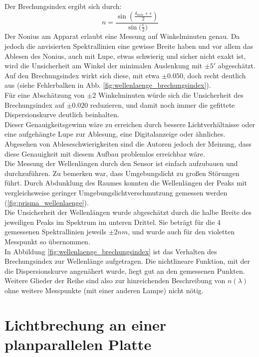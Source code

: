 \documentclass[12pt,a4paper]{article}
\begin{document}
\begin{multicols}{2}
Der Brechungsindex ergibt sich durch:
$$n = \frac{\sin{(\frac{\delta_{min} + \epsilon}{2})}}{\sin{(\frac{\epsilon}{2}})}$$
Der Nonius am Apparat erlaubt eine Messung auf Winkelminuten genau. Da jedoch die anvisierten Spektrallinien eine gewisse Breite haben und vor allem das Ablesen des Nonius, auch mit Lupe, etwas schwierig und sicher nicht exakt ist, wird die Unsicherheit am Winkel der minimalen Auslenkung mit $\pm 5'$ abgeschätzt.\\
Auf den Brechungsindex wirkt sich diese, mit etwa $\pm 0.050$, doch recht deutlich aus (siehe Fehlerbalken in Abb. \ref{fig:wellenlaenge_brechungsindex}).\\
Für eine Abschätzung von $\pm 2$ Winkelminuten würde sich die Unsicherheit des Brechungsindex auf $\pm 0.020$ reduzieren, und damit noch immer die gefittete Dispersionskurve deutlich beinhalten.\\
Dieser Genauigkeitsgewinn wäre zu erreichen durch bessere Lichtverhältnisse oder eine aufgehängte Lupe zur Ablesung, eine Digitalanzeige oder ähnliches. Abgesehen von Ableseschwierigkeiten sind die Autoren jedoch der Meinung, dass diese Genauigkeit mit diesem Aufbau problemlos erreichbar wäre.
\\
Die Messung der Wellenlängen durch den Sensor ist einfach aufzubauen und durchzuführen. Zu bemerken war, dass Umgebungslicht zu großen Störungen führt. Durch Abdunklung des Raumes konnten die Wellenlängen der Peaks mit vergleichsweise geringer Umgebungslichtverschmutzung gemessen werden (\ref{fig:prisma_wellenlaenge}).\\
Die Unsicherheit der Wellenlängen wurde abgeschätzt durch die halbe Breite des jeweiligen Peaks im Spektrum im unteren Drittel. Sie beträgt für die 4 gemessenen Spektrallinien jeweils $\pm 2nm$, und wurde auch für den violetten Messpunkt so übernommen.
\\
In Abbildung \ref{fig:wellenlaenge_brechungsindex} ist das Verhalten des Brechungsindex zur Wellenlänge aufgetragen. Die nichtlineare Funktion, mit der die Dispersionskurve angenähert wurde, liegt gut an den gemessenen Punkten. Weitere Glieder der Reihe sind also zur hinreichenden Beschreibung von $n(\lambda)$ ohne weitere Messpunkte (mit einer anderen Lampe) nicht nötig.

\section{Lichtbrechung an einer planparallelen Platte}


\end{multicols}
\end{document}
